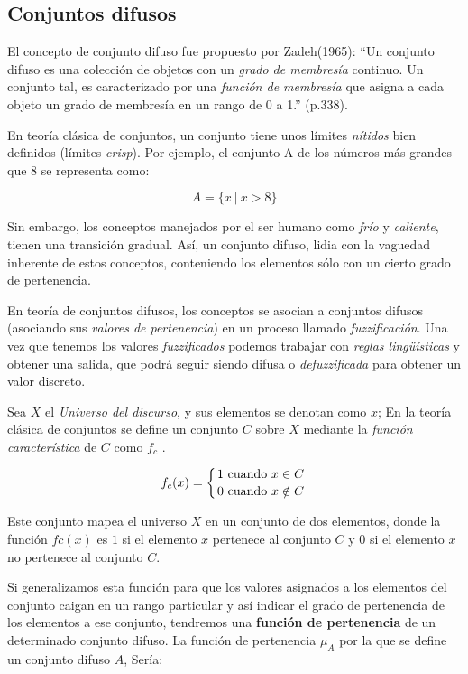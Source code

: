 \subsection{Conjuntos difusos}

El concepto de conjunto difuso fue propuesto por Zadeh(1965): ``Un conjunto difuso es una colección de objetos con un \textit{grado de membresía} continuo. Un conjunto tal, es caracterizado por una \textit{función de membresía} que asigna a cada objeto un grado de membresía en un rango de 0 a 1.'' (p.338).

En teoría clásica de conjuntos, un conjunto tiene unos límites \textit{nítidos} bien definidos (límites \textit{crisp}). Por ejemplo, el conjunto A de los números más grandes que 8 se representa como:

\begin{displaymath}
	A = \lbrace  x \ | \ x > 8 \rbrace
\end{displaymath}

Sin embargo, los conceptos manejados por el ser humano como \textit{frío} y \textit{caliente}, tienen una transición gradual. Así, un conjunto difuso, lidia con la vaguedad inherente de estos conceptos, conteniendo los elementos sólo con un cierto grado de pertenencia.
 
En teoría de conjuntos difusos, los conceptos se asocian a conjuntos difusos (asociando sus \emph{valores de pertenencia}) en un proceso llamado \emph{fuzzificación}. Una vez que tenemos los valores \emph{fuzzificados} podemos trabajar con \emph{reglas lingüísticas} y obtener una salida, que podrá seguir siendo difusa o \emph{defuzzificada} para obtener un valor discreto.

Sea $X$ el \emph{Universo del discurso}, y sus elementos se denotan como $x$; En la teoría clásica de conjuntos se define un conjunto $C$ sobre $X$ mediante la \emph{función característica} de $C$ como $f_c$ .

$$\displaystyle f_c(x) = \left\{ { 1 \mbox{ cuando } x \in C  \atop 0 \mbox{ cuando } x \notin C } \right.$$

Este conjunto mapea el universo $X$ en un conjunto de dos elementos,
donde la función $fc (x)$ es $1$ si el elemento $x$ pertenece al conjunto
$C$ y $0$ si el elemento $x$ no pertenece al conjunto $C$.

Si generalizamos esta función para que los valores asignados a los
elementos del conjunto caigan en un rango particular y así indicar
el grado de pertenencia de los elementos a ese conjunto, tendremos
una \textbf{función de pertenencia} de un determinado conjunto difuso.
La función de pertenencia $\mu_A $ por la que se define un conjunto difuso $A$,
Sería:


